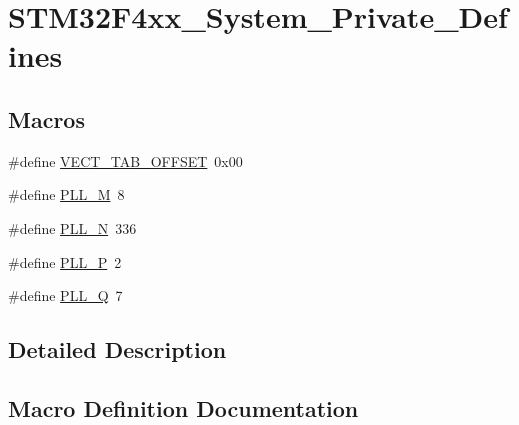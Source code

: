 \hypertarget{group___s_t_m32_f4xx___system___private___defines}{}\section{S\+T\+M32\+F4xx\+\_\+\+System\+\_\+\+Private\+\_\+\+Defines}
\label{group___s_t_m32_f4xx___system___private___defines}
\subsection*{Macros}
\begin{DoxyCompactItemize}
\item 
\#define \mbox{\hyperlink{group___s_t_m32_f4xx___system___private___defines_ga40e1495541cbb4acbe3f1819bd87a9fe}{V\+E\+C\+T\+\_\+\+T\+A\+B\+\_\+\+O\+F\+F\+S\+ET}}~0x00
\item 
\#define \mbox{\hyperlink{group___s_t_m32_f4xx___system___private___defines_ga0fa5a868f5cd056a04b1c42e454b9617}{P\+L\+L\+\_\+M}}~8
\item 
\#define \mbox{\hyperlink{group___s_t_m32_f4xx___system___private___defines_ga04586ea638d21afe558db4f2798c38a6}{P\+L\+L\+\_\+N}}~336
\item 
\#define \mbox{\hyperlink{group___s_t_m32_f4xx___system___private___defines_ga290dcd27167e925d817e8334111c1c01}{P\+L\+L\+\_\+P}}~2
\item 
\#define \mbox{\hyperlink{group___s_t_m32_f4xx___system___private___defines_gac958257ddb2537c539cffdb3a4543067}{P\+L\+L\+\_\+Q}}~7
\end{DoxyCompactItemize}


\subsection{Detailed Description}


\subsection{Macro Definition Documentation}
\mbox{\label{group___s_t_m32_f4xx___system___private___defines_ga0fa5a868f5cd056a04b1c42e454b9617}} 
